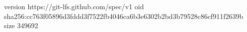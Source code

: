 version https://git-lfs.github.com/spec/v1
oid sha256:cc763f05896d3fddd3f7522fb4046ca6b3e6302b2bd3b79528c86cf911f2639b
size 349692
